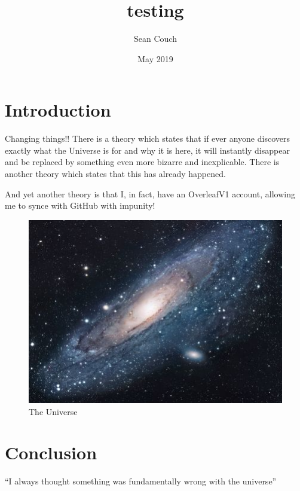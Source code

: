 \documentclass{article}
\title{testing}
\author{Sean Couch}
\date{May 2019}
\begin{document}
\maketitle

\section{Introduction}
Changing things!!  There is a theory which states that if ever anyone discovers exactly what the Universe is for and why it is here, it will instantly disappear and be replaced by something even more bizarre and inexplicable.
There is another theory which states that this has already happened.

And yet another theory is that I, in fact, have an OverleafV1 account, allowing me to synce with GitHub with impunity!

\begin{figure}[h!]
\centering
\includegraphics[scale=1.7]{universe}
\caption{The Universe}
\label{fig:universe}
\end{figure}

\section{Conclusion}
``I always thought something was fundamentally wrong with the universe'' \citep{adams1995hitchhiker}



\end{document}

